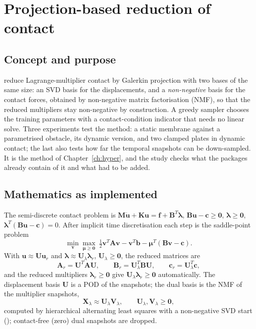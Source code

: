 \section{Projection-based reduction of contact}\label{sec:vf-bal}

\subsection*{Concept and purpose}

\citet{balajewicz2016contact} reduce Lagrange-multiplier contact by Galerkin projection with two bases of the same size: an SVD basis for the displacements, and a \emph{non-negative} basis for the contact forces, obtained by non-negative matrix factorisation (NMF), so that the reduced multipliers stay non-negative by construction. A greedy sampler chooses the training parameters with a contact-condition indicator that needs no linear solve. Three experiments test the method: a static membrane against a parametrised obstacle, its dynamic version, and two clamped plates in dynamic contact; the last also tests how far the temporal snapshots can be down-sampled. It is the method of Chapter~\ref{ch:hyper}, and the study checks what the packages already contain of it and what had to be added.

\subsection*{Mathematics as implemented}

The semi-discrete contact problem is $\mathbf M\ddot{\mathbf u}+\mathbf K\mathbf u=\mathbf f+\mathbf B^{T}\boldsymbol\lambda$, $\mathbf B\mathbf u-\mathbf c\ge\mathbf 0$, $\boldsymbol\lambda\ge\mathbf 0$, $\boldsymbol\lambda^{T}(\mathbf B\mathbf u-\mathbf c)=0$. After implicit time discretisation each step is the saddle-point problem
\begin{equation}\label{eq:bl-sp}
\min_{\mathbf v}\max_{\boldsymbol\mu\ge\mathbf 0}\ \tfrac12\mathbf v^{T}\mathbf A\mathbf v-\mathbf v^{T}\mathbf b-\boldsymbol\mu^{T}(\mathbf B\mathbf v-\mathbf c).
\end{equation}
With $\mathbf u\approx\mathbf U\mathbf u_r$ and $\boldsymbol\lambda\approx\mathbf U_\lambda\boldsymbol\lambda_r$, $\mathbf U_\lambda\ge\mathbf 0$, the reduced matrices are
\begin{equation}\label{eq:bl-red}
\mathbf A_r=\mathbf U^{T}\mathbf A\mathbf U,\qquad\mathbf B_r=\mathbf U_\lambda^{T}\mathbf B\mathbf U,\qquad\mathbf c_r=\mathbf U_\lambda^{T}\mathbf c,
\end{equation}
and the reduced multipliers $\boldsymbol\lambda_r\ge\mathbf 0$ give $\mathbf U_\lambda\boldsymbol\lambda_r\ge\mathbf 0$ automatically. The displacement basis $\mathbf U$ is a POD of the snapshots; the dual basis is the NMF of the multiplier snapshots,
\begin{equation}\label{eq:bl-nmf}
\mathbf X_\lambda\approx\mathbf U_\lambda\mathbf V_\lambda,\qquad\mathbf U_\lambda,\mathbf V_\lambda\ge\mathbf 0,
\end{equation}
computed by hierarchical alternating least squares with a non-negative SVD start (); contact-free (zero) dual snapshots are dropped.

